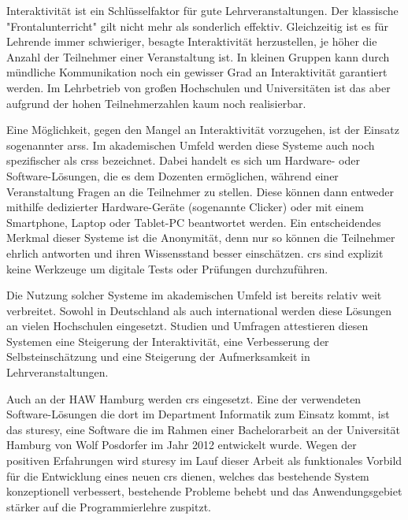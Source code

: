 Interaktivität ist ein Schlüsselfaktor für gute Lehrveranstaltungen. Der klassische "Frontalunterricht" gilt nicht mehr als sonderlich effektiv. Gleichzeitig ist es für Lehrende immer schwieriger, besagte Interaktivität herzustellen, je höher die Anzahl der Teilnehmer einer Veranstaltung ist. In kleinen Gruppen kann durch mündliche Kommunikation noch ein gewisser Grad an Interaktivität garantiert werden. Im Lehrbetrieb von großen Hochschulen und Universitäten ist das aber aufgrund der hohen Teilnehmerzahlen kaum noch realisierbar.

Eine Möglichkeit, gegen den Mangel an Interaktivität vorzugehen, ist der Einsatz sogenannter \acp{ars}. Im akademischen Umfeld werden diese Systeme auch noch spezifischer als \acp{crs} bezeichnet. Dabei handelt es sich um Hardware- oder Software-Lösungen, die es dem Dozenten ermöglichen, während einer Veranstaltung Fragen an die Teilnehmer zu stellen. Diese können dann entweder mithilfe dedizierter Hardware-Geräte (sogenannte Clicker) oder mit einem Smartphone, Laptop oder Tablet-PC beantwortet werden. Ein entscheidendes Merkmal dieser Systeme ist die Anonymität, denn nur so können die Teilnehmer ehrlich antworten und ihren Wissensstand besser einschätzen. \ac{crs} sind explizit keine Werkzeuge um digitale Tests oder Prüfungen durchzuführen.

Die Nutzung solcher Systeme im akademischen Umfeld ist bereits relativ weit verbreitet. Sowohl in Deutschland als auch international werden diese Lösungen an vielen Hochschulen eingesetzt. Studien und Umfragen attestieren diesen Systemen eine Steigerung der Interaktivität, eine Verbesserung der Selbsteinschätzung und eine Steigerung der Aufmerksamkeit in Lehrveranstaltungen.\cite{web:wisconsin, web:tenyears}

Auch an der HAW Hamburg werden \ac{crs} eingesetzt. Eine der verwendeten Software-Lösungen die dort im Department Informatik zum Einsatz kommt, ist das \ac{sturesy}, eine Software die im Rahmen einer Bachelorarbeit an der Universität Hamburg von Wolf Posdorfer im Jahr 2012 entwickelt wurde\cite{sturesy}. Wegen der positiven Erfahrungen wird \ac{sturesy} im Lauf dieser Arbeit als funktionales Vorbild für die Entwicklung eines neuen \ac{crs} dienen, welches das bestehende System konzeptionell verbessert, bestehende Probleme behebt und das Anwendungsgebiet stärker auf die Programmierlehre zuspitzt.